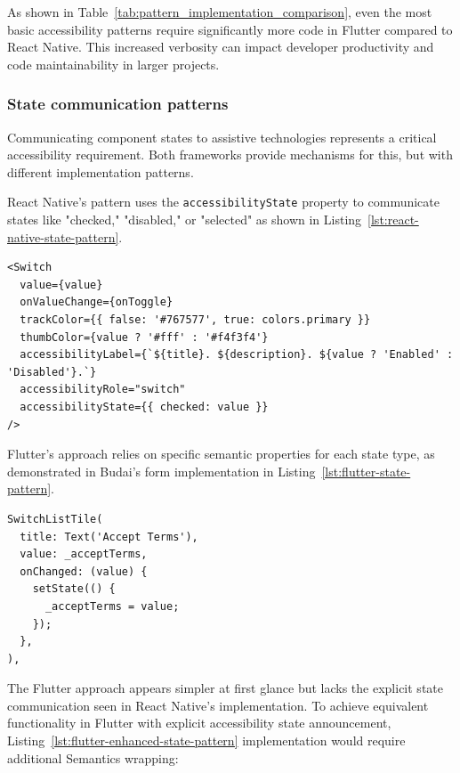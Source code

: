 {\FloatBarrier

As shown in Table~\ref{tab:pattern_implementation_comparison}, even the most basic accessibility patterns require significantly more code in Flutter compared to React Native. This increased verbosity can impact developer productivity and code maintainability in larger projects.

\subsubsection{State communication patterns}

Communicating component states to assistive technologies represents a critical accessibility requirement. Both frameworks provide mechanisms for this, but with different implementation patterns.

React Native's pattern uses the \texttt{accessibilityState} property to communicate states like "checked," "disabled," or "selected" as shown in Listing~\ref{lst:react-native-state-pattern}.

\begin{lstlisting}[style=ReactNativeStyle, caption=State communication in React Native, label=lst:react-native-state-pattern]
<Switch
  value={value}
  onValueChange={onToggle}
  trackColor={{ false: '#767577', true: colors.primary }}
  thumbColor={value ? '#fff' : '#f4f3f4'}
  accessibilityLabel={`${title}. ${description}. ${value ? 'Enabled' : 'Disabled'}.`}
  accessibilityRole="switch"
  accessibilityState={{ checked: value }}
/>
\end{lstlisting}

\FloatBarrier

Flutter's approach relies on specific semantic properties for each state type, as demonstrated in Budai's form implementation in Listing~\ref{lst:flutter-state-pattern}.

\begin{lstlisting}[style=DartStyle, caption=State communication in Flutter, label=lst:flutter-state-pattern]
SwitchListTile(
  title: Text('Accept Terms'),
  value: _acceptTerms,
  onChanged: (value) {
    setState(() {
      _acceptTerms = value;
    });
  },
),
\end{lstlisting}

\FloatBarrier

The Flutter approach appears simpler at first glance but lacks the explicit state communication seen in React Native's implementation. To achieve equivalent functionality in Flutter with explicit accessibility state announcement, Listing~\ref{lst:flutter-enhanced-state-pattern} implementation would require additional Semantics wrapping:

}
